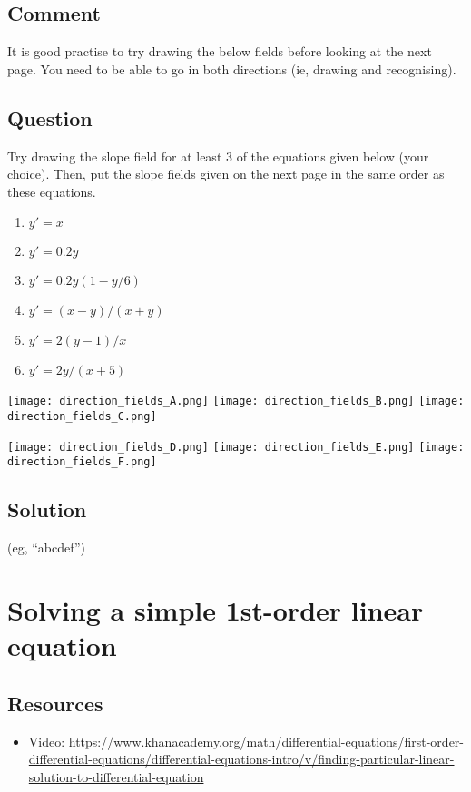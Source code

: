 \subsection*{Comment}
It is good practise to try drawing the below fields before looking at the next page. You need to be able to go in both directions (ie, drawing and recognising).

\subsection*{Question}
Try drawing the slope field for at least 3 of the equations given below (your choice). Then, put the slope fields given on the next page in the same order as these equations.

\begin{enumerate}
    \item $y'=x$
    \item $y'=0.2y$
    \item $y'=0.2y(1-y/6)$
    \item $y'=(x-y)/(x+y)$
    \item $y'=2(y-1)/x$
    \item $y'=2y/(x+5)$
\end{enumerate}

\newpage

\texttt{[image: direction\_fields\_A.png]}
\texttt{[image: direction\_fields\_B.png]}
\texttt{[image: direction\_fields\_C.png]}

\texttt{[image: direction\_fields\_D.png]}
\texttt{[image: direction\_fields\_E.png]}
\texttt{[image: direction\_fields\_F.png]}

\subsection*{Solution}
\six{} (eg, ``abcdef'')


\timebox


\newpage
\section{Solving a simple 1st-order linear equation}

\subsection*{Resources}
\begin{itemize}
    \item Video: \url{https://www.khanacademy.org/math/differential-equations/first-order-differential-equations/differential-equations-intro/v/finding-particular-linear-solution-to-differential-equation}
\end{itemize}


